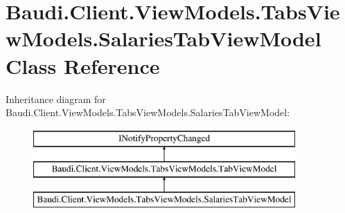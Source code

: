 \hypertarget{class_baudi_1_1_client_1_1_view_models_1_1_tabs_view_models_1_1_salaries_tab_view_model}{}\section{Baudi.\+Client.\+View\+Models.\+Tabs\+View\+Models.\+Salaries\+Tab\+View\+Model Class Reference}
\label{class_baudi_1_1_client_1_1_view_models_1_1_tabs_view_models_1_1_salaries_tab_view_model}
Inheritance diagram for Baudi.\+Client.\+View\+Models.\+Tabs\+View\+Models.\+Salaries\+Tab\+View\+Model\+:\begin{figure}[H]
\begin{center}
\leavevmode
\includegraphics[height=3.000000cm]{class_baudi_1_1_client_1_1_view_models_1_1_tabs_view_models_1_1_salaries_tab_view_model}
\end{center}
\end{figure}
